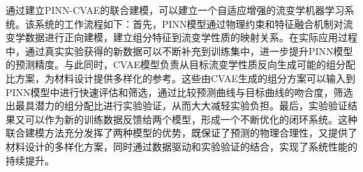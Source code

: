通过建立PINN-CVAE的联合建模，可以建立一个自适应增强的流变学机器学习系统。该系统的工作流程如下：首先，PINN模型通过物理约束和特征融合机制对流变学数据进行正向建模，建立组分特征到流变学性质的映射关系。在实际应用过程中，通过真实实验获得的新数据可以不断补充到训练集中，进一步提升PINN模型的预测精度。与此同时，CVAE模型负责从目标流变学性质反向生成可能的组分配比方案，为材料设计提供多样化的参考。这些由CVAE生成的组分方案可以输入到PINN模型中进行快速评估和筛选，通过比较预测曲线与目标曲线的吻合度，筛选出最具潜力的组分配比进行实验验证，从而大大减轻实验负担。最后，实验验证结果又可以作为新的训练数据反馈给两个模型，形成一个不断优化的闭环系统。这种联合建模方法充分发挥了两种模型的优势，既保证了预测的物理合理性，又提供了材料设计的多样化方案，同时通过数据驱动和实验验证的结合，实现了系统性能的持续提升。